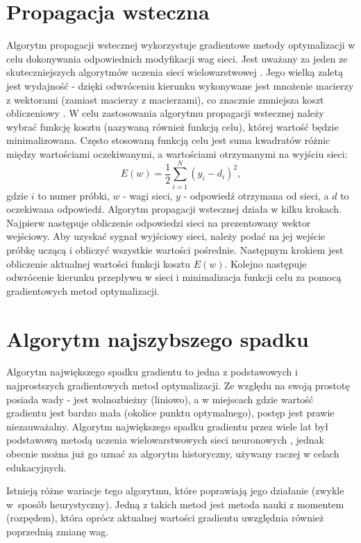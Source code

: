 \section{Propagacja wsteczna}
\label{Sec:ThBackprop}
Algorytm propagacji wstecznej wykorzystuje gradientowe metody optymalizacji w celu dokonywania odpowiednich modyfikacji wag sieci. Jest uważany za jeden ze skuteczniejszych algorytmów uczenia sieci wielowarstwowej \cite{osow01}. Jego wielką zaletą jest wydajność - dzięki odwróceniu kierunku wykonywane jest mnożenie macierzy z wektorami (zamiast macierzy z macierzami), co znacznie zmniejsza koszt obliczeniowy \cite{pml01}. W celu zastosowania algorytmu propagacji wstecznej należy wybrać funkcję kosztu (nazywaną również funkcją celu), której wartość będzie minimalizowana. Często stosowaną funkcją celu jest suma kwadratów różnic między wartościami oczekiwanymi, a wartościami otrzymanymi na wyjściu sieci: $$ E(w)=\frac{1}{2}\sum_{i=1}^{N}(y_i-d_i)^2,$$ gdzie $i$ to numer próbki, $w$ - wagi sieci, $y$ - odpowiedź otrzymana od sieci, a $d$ to oczekiwana odpowiedź. Algorytm propagacji wstecznej działa w kilku krokach. Najpierw następuje obliczenie odpowiedzi sieci na prezentowany wektor wejściowy. Aby uzyskać sygnał wyjściowy sieci, należy podać na jej wejście próbkę uczącą i obliczyć wszystkie wartości pośrednie. Następnym krokiem jest obliczenie aktualnej wartości funkcji kosztu $E(w)$. Kolejno następuje odwrócenie kierunku przepływu w sieci i minimalizacja funkcji celu za pomocą gradientowych metod optymalizacji.


\section{Algorytm najszybszego spadku}
\label{Sec:ThGrad}
Algorytm największego spadku gradientu to jedna z podstawowych i najprostszych gradientowych metod optymalizacji. Ze względu na swoją prostotę posiada wady - jest wolnozbieżny (liniowo), a w miejscach gdzie wartość gradientu jest bardzo mała (okolice punktu optymalnego), postęp jest prawie niezauważalny. Algorytm największego spadku gradientu przez wiele lat był podstawową metodą uczenia wielowarstwowych sieci neuronowych \cite{osow01}, jednak obecnie można już go uznać za algorytm historyczny, używany raczej w celach edukacyjnych.

Istnieją różne wariacje tego algorytmu, które poprawiają jego działanie (zwykle w~sposób heurystyczny). Jedną z takich metod jest metoda nauki z momentem (rozpędem), która oprócz aktualnej wartości gradientu uwzględnia również poprzednią zmianę wag.


